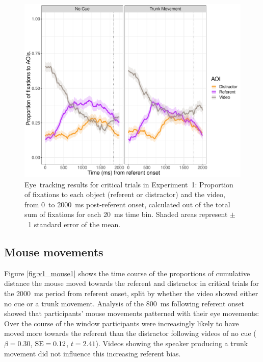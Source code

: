\documentclass[a4paper,man,natbib]{apa6}
\newcommand{\resultsLM}[3]{$\beta = #1$, $\textnormal{SE} = #2$, $t #3$}
\begin{document}


\begin{figure}[Ht]
  \centering
	\includegraphics[width=\linewidth]{./img/e7_fixations_crit.pdf}
        \caption{Eye~tracking results for critical trials in Experiment~1: Proportion of fixations to each object (referent or distractor) and the video, from 0~to 2000~ms post-referent onset, calculated out of the total sum of fixations for each 20~ms time bin. Shaded areas represent $\pm$~1 standard error of the mean.}
  \label{fig:v1_eye1}
\end{figure}

\subsection{Mouse movements}
Figure \ref{fig:v1_mouse1} shows the time course of the proportions of cumulative distance the mouse moved towards the referent and distractor in critical trials for the 2000~ms period from referent onset, split by whether the video showed either no cue or a trunk movement.
Analysis of the 800~ms following referent onset showed that participants' mouse movements patterned with their eye movements:
Over the course of the window participants were increasingly likely to have moved more towards the referent than the distractor following videos of no cue (\resultsLM{0.30}{0.12}{=2.41}). 
Videos showing the speaker producing a trunk movement did not influence this increasing referent bias.
\end{document}
